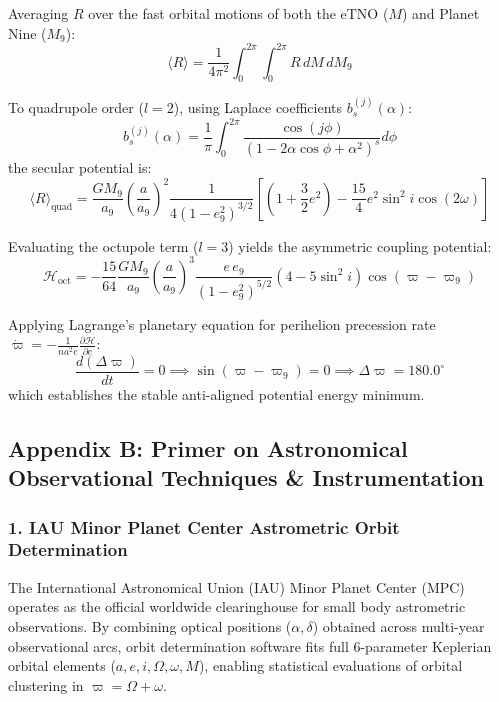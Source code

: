 \documentclass[11pt,a4paper]{article}
\begin{document}
Averaging $R$ over the fast orbital motions of both the eTNO ($M$) and Planet Nine ($M_9$):
\begin{equation}
\langle R \rangle = \frac{1}{4\pi^2} \int_0^{2\pi} \int_0^{2\pi} R \, dM \, dM_9
\end{equation}

To quadrupole order ($l=2$), using Laplace coefficients $b_{s}^{(j)}(\alpha)$:
\begin{equation}
b_{s}^{(j)}(\alpha) = \frac{1}{\pi} \int_{0}^{2\pi} \frac{\cos(j \phi)}{(1 - 2\alpha \cos\phi + \alpha^2)^s} d\phi
\end{equation}
the secular potential is:
\begin{equation}
\langle R \rangle_{\text{quad}} = \frac{G M_9}{a_9} \left( \frac{a}{a_9} \right)^2 \frac{1}{4 (1 - e_9^2)^{3/2}} \left[ \left(1 + \frac{3}{2} e^2\right) - \frac{15}{4} e^2 \sin^2 i \cos(2\omega) \right]
\end{equation}

Evaluating the octupole term ($l=3$) yields the asymmetric coupling potential:
\begin{equation}
\mathcal{H}_{\text{oct}} = -\frac{15}{64} \frac{G M_9}{a_9} \left( \frac{a}{a_9} \right)^3 \frac{e \, e_9}{(1 - e_9^2)^{5/2}} \left( 4 - 5 \sin^2 i \right) \cos(\varpi - \varpi_9)
\end{equation}

Applying Lagrange's planetary equation for perihelion precession rate $\dot{\varpi} = -\frac{1}{n a^2 e} \frac{\partial \mathcal{H}}{\partial e}$:
\begin{equation}
\frac{d(\Delta \varpi)}{dt} = 0 \implies \sin(\varpi - \varpi_9) = 0 \implies \Delta \varpi = 180.0^\circ
\end{equation}
which establishes the stable anti-aligned potential energy minimum.

\subsection*{Appendix B: Primer on Astronomical Observational Techniques \& Instrumentation}

\subsubsection*{1. IAU Minor Planet Center Astrometric Orbit Determination}
The International Astronomical Union (IAU) Minor Planet Center (MPC) operates as the official worldwide clearinghouse for small body astrometric observations. By combining optical positions ($\alpha, \delta$) obtained across multi-year observational arcs, orbit determination software fits full 6-parameter Keplerian orbital elements ($a, e, i, \Omega, \omega, M$), enabling statistical evaluations of orbital clustering in $\varpi = \Omega + \omega$.
\end{document}
